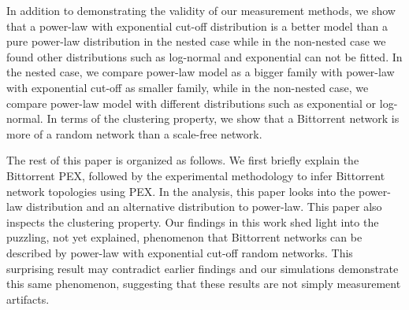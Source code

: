 \documentclass[paper]{ieice}
\begin{document}

In addition to demonstrating the validity of our measurement methods, we show that a power-law with exponential cut-off distribution is a better model than a pure power-law distribution in the nested case while in the non-nested case we found other distributions such as log-normal and exponential can not be fitted.
In the nested case, we compare power-law model as a bigger family with power-law with exponential cut-off as smaller family, while in the non-nested case, we compare power-law model with different distributions such as exponential or log-normal.
In terms of the clustering property, we show that a Bittorrent network is more of a random network than a scale-free network. 

The rest of this paper is organized as follows. We first briefly explain the Bittorrent PEX, followed by the experimental methodology to infer Bittorrent network topologies using PEX. 
In the analysis, this paper looks into the power-law distribution and an alternative distribution to power-law. 
This paper also inspects the clustering property.
Our findings in this work shed light into the puzzling, not yet explained, phenomenon that Bittorrent networks can be described by power-law with exponential cut-off random networks.
This surprising result may contradict earlier findings and our simulations demonstrate this same phenomenon, suggesting that these results are not simply measurement artifacts.
\end{document}
